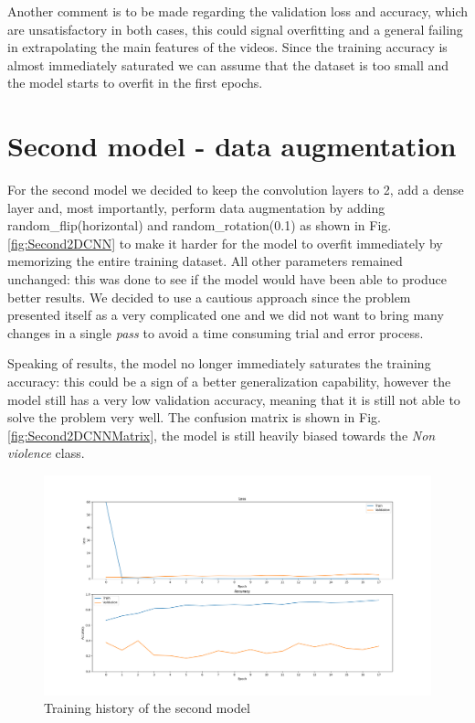 Another comment is to be made regarding the validation loss and accuracy, which are unsatisfactory in both cases, this could signal overfitting and a general failing in extrapolating the main features of the videos. Since the training accuracy is almost immediately saturated we can assume that the dataset is too small and the model starts to overfit in the first epochs.


\section{Second model - data augmentation}
For the second model we decided to keep the convolution layers to 2, add a dense layer and, most importantly, perform data augmentation by adding random\_flip(horizontal) and random\_rotation(0.1)  as shown in Fig. \ref{fig:Second2DCNN} to make it harder for the model to overfit immediately by memorizing the entire training dataset. All other parameters remained unchanged: this was done to see if the model would have been able to produce better results. 
We decided to use a cautious approach since the problem presented itself as a very complicated one and we did not want to bring many changes in a single \textit{pass} to avoid a time consuming trial and error process. 

Speaking of results, the model no longer immediately saturates the training accuracy: this could be a sign of a better generalization capability, however the model still has a very low validation accuracy,  meaning that it is still not able to solve the problem very well. The confusion matrix is shown in Fig. \ref{fig:Second2DCNNMatrix}, the model is still heavily biased towards the \textit{Non violence} class.

\begin{figure}[]
    \centering
    \includegraphics[width=1\textwidth]{images/731a-simple4augnozoom-b538-history.png}
    \caption{Training history of the second model}
    \label{fig:Second2DCNNHistory}
\end{figure}

